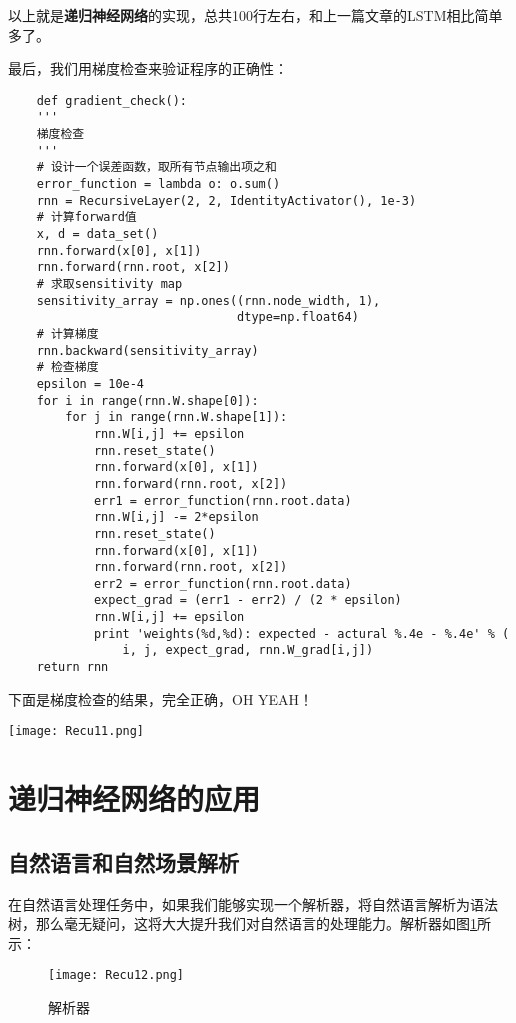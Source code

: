 以上就是\textbf{递归神经网络}的实现，总共100行左右，和上一篇文章的LSTM相比简单多了。

最后，我们用梯度检查来验证程序的正确性：
\begin{lstlisting}
    def gradient_check():
    '''
    梯度检查
    '''
    # 设计一个误差函数，取所有节点输出项之和
    error_function = lambda o: o.sum()
    rnn = RecursiveLayer(2, 2, IdentityActivator(), 1e-3)
    # 计算forward值
    x, d = data_set()
    rnn.forward(x[0], x[1])
    rnn.forward(rnn.root, x[2])
    # 求取sensitivity map
    sensitivity_array = np.ones((rnn.node_width, 1),
                                dtype=np.float64)
    # 计算梯度
    rnn.backward(sensitivity_array)
    # 检查梯度
    epsilon = 10e-4
    for i in range(rnn.W.shape[0]):
        for j in range(rnn.W.shape[1]):
            rnn.W[i,j] += epsilon
            rnn.reset_state()
            rnn.forward(x[0], x[1])
            rnn.forward(rnn.root, x[2])
            err1 = error_function(rnn.root.data)
            rnn.W[i,j] -= 2*epsilon
            rnn.reset_state()
            rnn.forward(x[0], x[1])
            rnn.forward(rnn.root, x[2])
            err2 = error_function(rnn.root.data)
            expect_grad = (err1 - err2) / (2 * epsilon)
            rnn.W[i,j] += epsilon
            print 'weights(%d,%d): expected - actural %.4e - %.4e' % (
                i, j, expect_grad, rnn.W_grad[i,j])
    return rnn
\end{lstlisting}


下面是梯度检查的结果，完全正确，OH YEAH！

\texttt{[image: Recu11.png]}

\section{递归神经网络的应用}\label{Recu:8}
\subsection{自然语言和自然场景解析}\label{Recu:9}

在自然语言处理任务中，如果我们能够实现一个解析器，将自然语言解析为语法树，那么毫无疑问，这将大大提升我们对自然语言的处理能力。解析器如图\ref{fig:Recu12}所示：

\begin{figure}[!h]
	\centering
	\texttt{[image: Recu12.png]}
	\caption{解析器}
	\label{fig:Recu12}
\end{figure}

